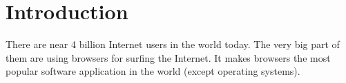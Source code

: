 \chapter*{Introduction}


There are near 4 billion Internet users in the world today. The very big part of them are using browsers for surfing the Internet.
It makes browsers the most popular software application in the world (except operating systems). 